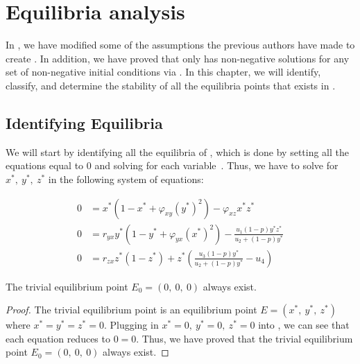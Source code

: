 % 
\chapter{Equilibria analysis}\label{ch:equilibria-analysis}
In , we have modified some of the assumptions the previous authors have made to create . In addition, we have proved that  only has non-negative solutions for any set of non-negative initial conditions via . In this chapter, we will identify, classify, and determine the stability of all the equilibria points that exists in . 

\section{Identifying Equilibria}
We will start by identifying all the equilibria of , which is done by setting all the equations equal to 0 and solving for each variable~\cite{Strogatz9780813349107}. Thus, we have to solve for $x^*,\ y^*,\ z^*$ in the following system of equations:

\begin{subequations}\label{system:model-0}
    \begin{align}
        0 &= x^*\left(1-x^*+\varphi_{xy}\left(y^*\right)^2\right)-\varphi_{xz}x^*z^* \label{eq:model-0-x}\\
        0 &= r_{yx}y^*\left(1-y^*+\varphi_{yx}\left(x^*\right)^2\right)-\frac{u_1\left(1-p\right)y^*z^*}{u_2+\left(1-p\right)y^*} \label{eq:model-0-y}\\
        0 &= r_{zx}z^*\left(1-z^*\right)+z^*\left(\frac{u_3\left(1-p\right)y^*}{u_2+\left(1-p\right)y^*}-u_4\right) \label{eq:model-0-z}
    \end{align}
\end{subequations}

\begin{theorem}\label{thm:eq-trivial-exist}
    The trivial equilibrium point $E_0=\left(0,\ 0,\ 0\right)$ always exist.
\end{theorem}
\begin{proof}
    The trivial equilibrium point is an equilibrium point $E=\left(x^*,\ y^*,\ z^*\right)$ where $x^*=y^*=z^*=0$. Plugging in $x^*=0,\ y^*=0,\ z^*=0$ into , we can see that each equation reduces to $0=0$. Thus, we have proved that the trivial equilibrium point $E_0=\left(0,\ 0,\ 0\right)$ always exist.
\end{proof}

